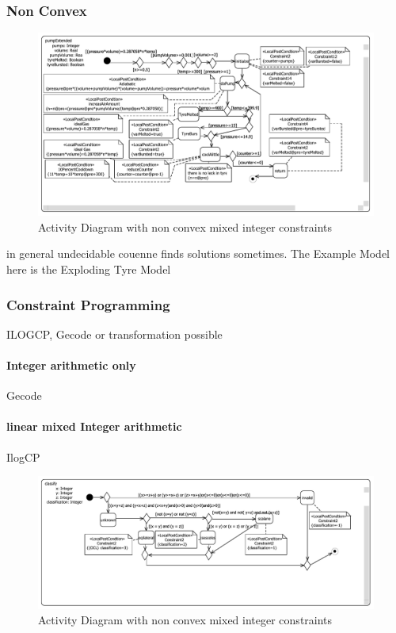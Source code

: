 \subsubsection{Non Convex}
\label{sec:exampleModelNonConvex}
\begin{figure}
\label{fig:pumpTyre}
\includegraphics[width=\textwidth]{./pics/pumpTyre.pdf}
\caption{Activity Diagram with non convex mixed integer constraints}
\end{figure}
in general undecidable couenne finds solutions sometimes.
The Example Model here is the Exploding Tyre Model
\subsubsection{Constraint Programming}
ILOGCP, Gecode or transformation possible
\paragraph{Integer arithmetic only} Gecode
\paragraph{linear mixed Integer arithmetic} IlogCP
\begin{figure}
\label{fig:classifyTriangle}
\includegraphics[width=\textwidth]{./pics/TriangleClassificator.pdf}
\caption{Activity Diagram with non convex mixed integer constraints}
\end{figure}
